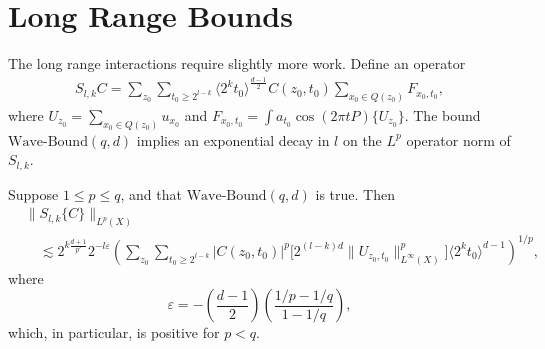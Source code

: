 \section{Long Range Bounds}

The long range interactions require slightly more work. Define an operator
%
\begin{align*}
    S_{l,k} C = \sum\nolimits_{z_0} \sum\nolimits_{t_0 \geq 2^{l-k}} \langle 2^k t_0 \rangle^{\frac{d-1}{2}} C(z_0,t_0) \sum\nolimits_{x_0 \in Q(z_0)} F_{x_0,t_0},
\end{align*}
%
where $U_{z_0} = \sum_{x_0 \in Q(z_0)} u_{x_0}$ and $F_{x_0,t_0} = \int a_{t_0} \cos(2 \pi t P) \{ U_{z_0} \}$. The bound $\text{Wave-Bound}(q,d)$ implies an exponential decay in $l$ on the $L^p$ operator norm of $S_{l,k}$.

\begin{lemma}
    Suppose $1 \leq p \leq q$, and that $\text{Wave-Bound}(q,d)$ is true. Then
    \begin{align*}
        &\| S_{l,k} \{ C \} \|_{L^p(X)}\\
        &\quad \lesssim 2^{k \frac{d+1}{p'}} 2^{- l \varepsilon} \left( \sum\nolimits_{z_0} \sum\nolimits_{t_0 \geq 2^{l-k}} |C(z_0,t_0)|^p \big[ 2^{(l-k)d} \| U_{z_0,t_0} \|_{L^\infty(X)}^p \big] \langle 2^k t_0 \rangle^{d-1} \right)^{1/p},
    \end{align*}
    where
    \[ \varepsilon = - \left( \frac{d-1}{2} \right) \left( \frac{1/p - 1/q}{1 - 1/q} \right), \]
    which, in particular, is positive for $p < q$.
\end{lemma}
